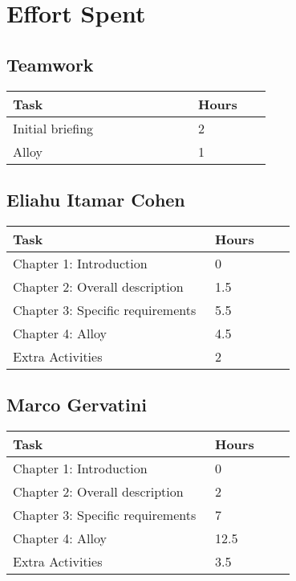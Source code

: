 \chapter{Effort Spent}

\section{Teamwork}
\begin{center}
    \begin{tabular}{@{}p{0.5\linewidth} p{0.2\linewidth}@{}}
        \hline
        \textbf{Task} & \textbf{Hours} \\ \hline
        Initial briefing & 2 \\ \hline
        Alloy & 1 \\ \hline
    \end{tabular}
\end{center}

\section{Eliahu Itamar Cohen}
\begin{center}
    \begin{tabular}{@{}p{0.5\linewidth} p{0.2\linewidth}@{}}
        \hline
        \textbf{Task} & \textbf{Hours} \\ \hline
        Chapter 1: Introduction & 0 \\ \hline
        Chapter 2: Overall description & 1.5 \\ \hline
        Chapter 3: Specific requirements & 5.5 \\ \hline
        Chapter 4: Alloy & 4.5 \\ \hline
        Extra Activities & 2 \\ \hline
    \end{tabular}
\end{center}

\section{Marco Gervatini}
\begin{center}
	\begin{tabular}{@{}p{0.5\linewidth} p{0.2\linewidth}@{}}
		\hline
		\textbf{Task} & \textbf{Hours} \\ \hline
            Chapter 1: Introduction & 0 \\ \hline
            Chapter 2: Overall description & 2 \\ \hline
            Chapter 3: Specific requirements & 7 \\ \hline
            Chapter 4: Alloy & 12.5 \\ \hline
            Extra Activities & 3.5 \\ \hline
	\end{tabular}
\end{center}

